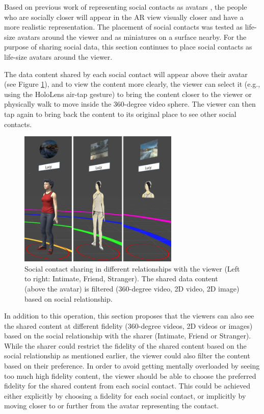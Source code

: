 Based on previous work of representing social contacts as avatars \cite{Nassani2017a}, the people who are socially closer will appear in the AR view visually closer and have a more realistic representation. The placement of social contacts was tested as life-size avatars around the viewer and as miniatures on a surface nearby. For the purpose of sharing social data, this section continues to place social contacts as life-size avatars around the viewer. 

The data content shared by each social contact will appear above their avatar (see Figure \ref{fig:data:viewer}), and to view the content more clearly, the viewer can select it (e.g., using the HoloLens air-tap gesture) to bring the content closer to the viewer or physically walk to move inside the 360-degree video sphere. The viewer can then tap again to bring back the content to its original place to see other social contacts. 

\begin{figure}[ht]
    \centering
    \includegraphics[width=3in]{images/52-data-chi/3_levels_of_data.png}
    \caption{Social contact sharing in different relationships with the viewer (Left to right: Intimate, Friend, Stranger). The shared data content (above the avatar) is filtered (360-degree video, 2D video, 2D image) based on social relationship.}
      \label{fig:data:viewer}
\end{figure}

In addition to this operation, this section proposes that the viewers can also see the shared content at different fidelity (360-degree videos, 2D videos or images) based on the social relationship with the sharer (Intimate, Friend or Stranger). While the sharer could restrict the fidelity of the shared content based on the social relationship as mentioned earlier, the viewer could also filter the content based on their preference. In order to avoid getting mentally overloaded by seeing too much high fidelity content, the viewer should be able to choose the preferred fidelity for the shared content from each social contact. This could be achieved either explicitly by choosing a fidelity for each social contact, or implicitly by moving closer to or further from the avatar representing the contact.

